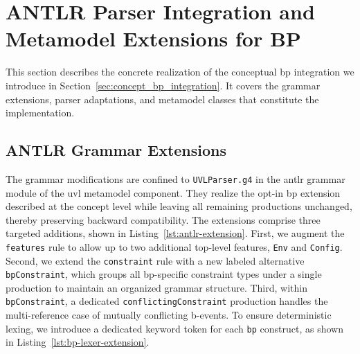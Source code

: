 \section{ANTLR Parser Integration and Metamodel Extensions for BP}
\label{sec:impl_uvl_metamodel}

This section describes the concrete realization of the conceptual \gls{bp} integration we introduce in Section~\ref{sec:concept_bp_integration}.
It covers the grammar extensions, parser adaptations, and metamodel classes that constitute the implementation.

\subsection{ANTLR Grammar Extensions}
\label{subsec:impl_uvl_metamodel_antlr}

The grammar modifications are confined to \texttt{UVLParser.g4} in the \gls{antlr} grammar module of the \gls{uvl} metamodel component.
They realize the opt-in \gls{bp} extension described at the concept level while leaving all remaining productions unchanged, thereby preserving backward compatibility.
The extensions comprise three targeted additions, shown in Listing~\ref{lst:antlr-extension}.
First, we augment the \texttt{features} rule to allow up to two additional top-level features, \texttt{Env} and \texttt{Config}.
Second, we extend the \texttt{constraint} rule with a new labeled alternative \texttt{bpConstraint}, which groups all \gls{bp}-specific constraint types under a single production to maintain an organized grammar structure.
Third, within \texttt{bpConstraint}, a dedicated \texttt{conflictingConstraint} production handles the multi-reference case of mutually conflicting b-events.
To ensure deterministic lexing, we introduce a dedicated keyword token for each \texttt{bp} construct, as shown in Listing~\ref{lst:bp-lexer-extension}.





